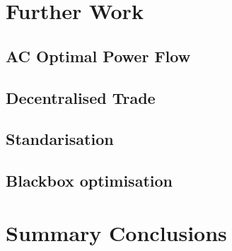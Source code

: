 \chapter{Further Work}
\label{ch:future}
%
%

\section{AC Optimal Power Flow}
\section{Decentralised Trade}
\section{Standarisation}
\section{Blackbox optimisation}

\chapter{Summary Conclusions}
\label{ch:conclusion}
